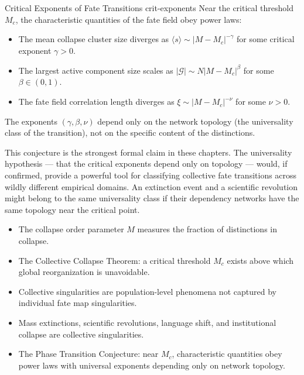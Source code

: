 \documentclass[12pt,twoside,openright]{book}
\newenvironment{chapsummary}{%
  \begin{tcolorbox}[colback=DistBlue!5,colframe=DistBlue,
    title={\faBookOpen\enspace Summary},
    fonttitle=\sffamily\bfseries\color{white},
    attach boxed title to top left={yshift=-2mm,xshift=4mm},
    boxed title style={colback=DistBlue,rounded corners}]
  \begin{itemize}[nosep,leftmargin=*]}{%
  \end{itemize}\end{tcolorbox}}
\providecommand{\orderParam}{M}
\providecommand{\critThresh}{M_{c}}
\begin{document}
\begin{conjecture}{Critical Exponents of Fate Transitions}%
  {crit-exponents}
Near the critical threshold $\critThresh$, the characteristic
quantities of the fate field obey power laws:
\begin{itemize}[nosep,leftmargin=2em]
  \item The mean collapse cluster size diverges as
    $\langle s\rangle \sim |\orderParam-\critThresh|^{-\gamma}$
    for some critical exponent $\gamma>0$.
  \item The largest active component size scales as
    $|\mathcal{G}|\sim N|\orderParam-\critThresh|^\beta$
    for some $\beta\in(0,1)$.
  \item The fate field correlation length diverges as
    $\xi\sim|\orderParam-\critThresh|^{-\nu}$ for some $\nu>0$.
\end{itemize}
The exponents $(\gamma,\beta,\nu)$ depend only on the network
topology (the universality class of the transition), not on
the specific content of the distinctions.
\end{conjecture}

This conjecture is the strongest formal claim in these chapters.
The universality hypothesis --- that the critical exponents
depend only on topology --- would, if confirmed, provide a
powerful tool for classifying collective fate transitions across
wildly different empirical domains. An extinction event and a
scientific revolution might belong to the same universality
class if their dependency networks have the same topology near
the critical point.

\begin{chapsummary}
\item The collapse order parameter $\orderParam$ measures the
  fraction of distinctions in collapse.
\item The Collective Collapse Theorem: a critical threshold
  $\critThresh$ exists above which global reorganization is
  unavoidable.
\item Collective singularities are population-level phenomena
  not captured by individual fate map singularities.
\item Mass extinctions, scientific revolutions, language shift,
  and institutional collapse are collective singularities.
\item The Phase Transition Conjecture: near $\critThresh$,
  characteristic quantities obey power laws with universal
  exponents depending only on network topology.
\end{chapsummary}
\end{document}
